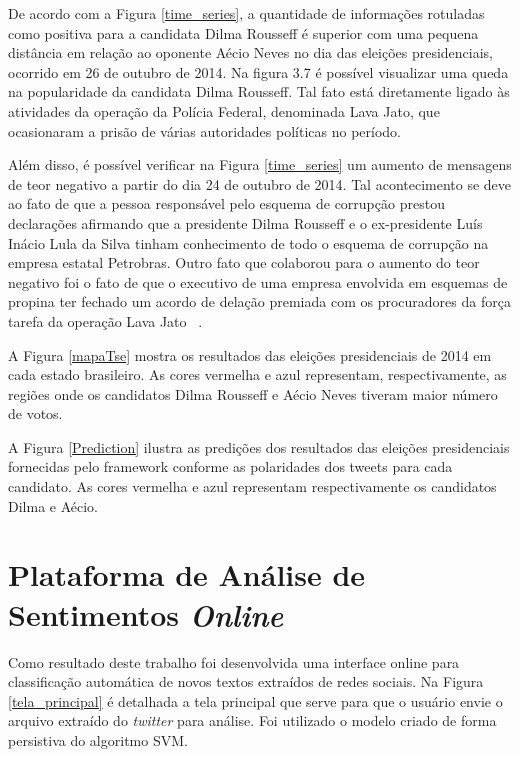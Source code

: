  
De acordo com a Figura \ref{time_series}, a quantidade de informações rotuladas como positiva para a candidata Dilma Rousseff é superior com uma pequena distância em
relação ao oponente Aécio Neves no dia das eleições presidenciais, ocorrido em 26 de outubro de 2014. 
 Na figura 3.7 é possível visualizar uma queda na popularidade da candidata Dilma Rousseff. Tal fato está diretamente ligado às atividades da operação da Polícia Federal, denominada Lava Jato, que ocasionaram a prisão de várias autoridades políticas no período. 

Além disso, é possível verificar na Figura \ref{time_series} um aumento de mensagens de teor negativo a partir do dia 24 de outubro de 2014. Tal acontecimento se deve ao fato de que a pessoa responsável pelo esquema de 
corrupção prestou declarações afirmando que a presidente Dilma Rousseff e o ex-presidente Luís Inácio Lula da Silva tinham conhecimento de todo o esquema de corrupção na empresa estatal Petrobras. Outro fato que colaborou para o aumento do teor negativo foi o fato de que o executivo de uma empresa envolvida em esquemas de propina ter fechado um acordo de delação premiada com os procuradores da força tarefa da operação Lava Jato  ~\cite{LavaJato}. 
 
 
A Figura \ref{mapaTse} mostra os resultados das eleições presidenciais de 2014 em cada estado brasileiro. 
As cores vermelha e azul representam, respectivamente, as regiões onde os candidatos Dilma Rousseff e 
Aécio Neves tiveram maior número de votos.
 
 
 
A Figura \ref{Prediction} ilustra as predições dos resultados das eleições presidenciais fornecidas pelo framework conforme 
as polaridades dos tweets para cada candidato. As cores vermelha e azul representam respectivamente os candidatos Dilma e Aécio.
 
 
 
 
 
 \section{Plataforma de Análise de Sentimentos \textit{Online}}
 
 Como resultado deste trabalho foi desenvolvida uma interface online para classificação automática de novos textos
 extraídos de redes sociais. Na Figura \ref{tela_principal} é detalhada a tela principal que serve para que o usuário
 envie o arquivo extraído do \textit{twitter} para análise. Foi utilizado o modelo criado de forma persistiva do algoritmo 
 \acrshort{SVM}.
 
